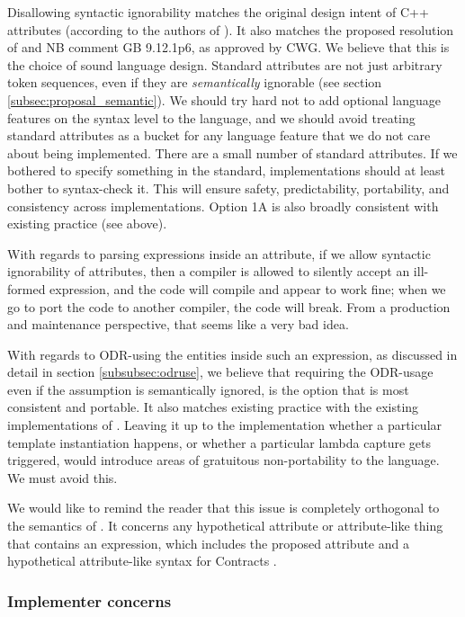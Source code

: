  Disallowing syntactic ignorability matches the original design intent of C++ attributes (according to the authors of \cite{N2761}). It also matches the proposed resolution of \cite{CWG2538} and NB comment GB 9.12.1p6, as approved by CWG. We believe that this is the choice of sound language design. Standard attributes are not just arbitrary token sequences, even if they are \emph{semantically} ignorable (see section \ref{subsec:proposal_semantic}). We should try hard not to add optional language features on the syntax level to the language, and we should avoid treating standard attributes as a bucket for any language feature that we do not care about being implemented. There are a small number of standard attributes. If we bothered to specify something in the standard, implementations should at least bother to syntax-check it. This will ensure safety, predictability, portability, and consistency across implementations. Option 1A is also broadly consistent with existing practice (see above).

With regards to parsing expressions inside an attribute, if we allow syntactic ignorability of attributes, then a compiler is allowed to silently accept an ill-formed expression, and the code will compile and appear to work fine; when we go to port the code to another compiler, the code will break. From a production and maintenance perspective, that seems like a very bad idea. 
 
With regards to ODR-using the entities inside such an expression, as discussed in detail in section \ref{subsubsec:odruse}, we believe that requiring the ODR-usage even if the assumption is semantically ignored, is the option that is most consistent and portable. It also matches existing practice with the existing implementations of . Leaving it up to the implementation whether a particular template instantiation happens, or whether a particular lambda capture gets triggered, would introduce areas of gratuitous non-portability to the language. We must avoid this. 

We would like to remind the reader that this issue is completely orthogonal to the semantics of . It concerns any hypothetical attribute or attribute-like thing that contains an expression, which includes the proposed  attribute \cite{P1144R5} and a hypothetical attribute-like syntax for Contracts \cite{P2487R0}.

\subsubsection{Implementer concerns}
 
